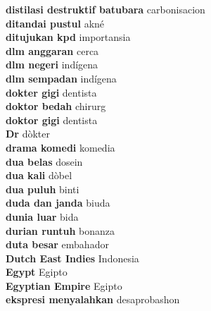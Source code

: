 \textbf{ distilasi destruktif batubara  } carbonisacion \\
\textbf{ ditandai pustul  } akné \\
\textbf{ ditujukan kpd  } importansia \\
\textbf{ dlm anggaran  } cerca \\
\textbf{ dlm negeri  } indígena \\
\textbf{ dlm sempadan  } indígena \\
\textbf{ dokter gigi  } dentista \\
\textbf{ doktor bedah  } chirurg \\
\textbf{ doktor gigi  } dentista \\
\textbf{ Dr  } dòkter \\
\textbf{ drama komedi  } komedia \\
\textbf{ dua belas  } dosein \\
\textbf{ dua kali  } dòbel \\
\textbf{ dua puluh  } binti \\
\textbf{ duda dan janda  } biuda \\
\textbf{ dunia luar  } bida \\
\textbf{ durian runtuh  } bonanza \\
\textbf{ duta besar  } embahador \\
\textbf{ Dutch East Indies  } Indonesia \\
\textbf{ Egypt  } Egipto \\
\textbf{ Egyptian Empire  } Egipto \\
\textbf{ ekspresi menyalahkan  } desaprobashon \\
